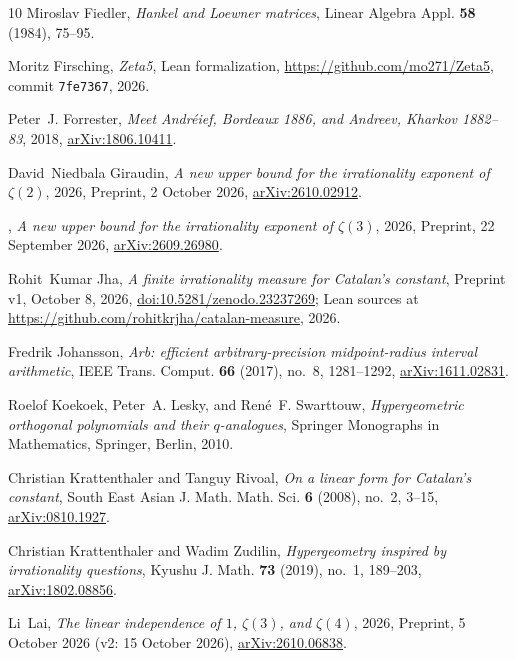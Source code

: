 \documentclass[11pt]{amsart}
\theoremstyle{definition}
\theoremstyle{remark}
\numberwithin{equation}{section}
\begin{document}
\begin{thebibliography}{10}
Miroslav Fiedler, \emph{Hankel and {L}oewner matrices}, Linear Algebra Appl.
  \textbf{58} (1984), 75--95.

Moritz Firsching, \emph{Zeta5}, Lean formalization,
  \url{https://github.com/mo271/Zeta5}, commit \texttt{7fe7367}, 2026.

Peter~J. Forrester, \emph{Meet {A}ndr\'eief, {B}ordeaux 1886, and {A}ndreev,
  {K}harkov 1882--83}, 2018,
  \href{https://arxiv.org/abs/1806.10411}{arXiv:1806.10411}.

David~Niedbala Giraudin, \emph{A new upper bound for the irrationality exponent
  of {$\zeta(2)$}}, 2026, Preprint, 2 October 2026,
  \href{https://arxiv.org/abs/2610.02912}{arXiv:2610.02912}.

\bysame, \emph{A new upper bound for the irrationality exponent of
  {$\zeta(3)$}}, 2026, Preprint, 22 September 2026,
  \href{https://arxiv.org/abs/2609.26980}{arXiv:2609.26980}.

Rohit~Kumar Jha, \emph{A finite irrationality measure for {C}atalan's
  constant}, Preprint v1, October 8, 2026,
  \href{https://doi.org/10.5281/zenodo.23237269}{doi:10.5281/zenodo.23237269};
  Lean sources at \url{https://github.com/rohitkrjha/catalan-measure}, 2026.

Fredrik Johansson, \emph{Arb: efficient arbitrary-precision midpoint-radius
  interval arithmetic}, IEEE Trans. Comput. \textbf{66} (2017), no.~8,
  1281--1292, \href{https://arxiv.org/abs/1611.02831}{arXiv:1611.02831}.

Roelof Koekoek, Peter~A. Lesky, and Ren\'e~F. Swarttouw, \emph{Hypergeometric
  orthogonal polynomials and their {$q$}-analogues}, Springer Monographs in
  Mathematics, Springer, Berlin, 2010.

Christian Krattenthaler and Tanguy Rivoal, \emph{On a linear form for
  {C}atalan's constant}, South East Asian J. Math. Math. Sci. \textbf{6}
  (2008), no.~2, 3--15,
  \href{https://arxiv.org/abs/0810.1927}{arXiv:0810.1927}.

Christian Krattenthaler and Wadim Zudilin, \emph{Hypergeometry inspired by
  irrationality questions}, Kyushu J. Math. \textbf{73} (2019), no.~1,
  189--203, \href{https://arxiv.org/abs/1802.08856}{arXiv:1802.08856}.

Li~Lai, \emph{The linear independence of {$1$}, {$\zeta(3)$}, and
  {$\zeta(4)$}}, 2026, Preprint, 5 October 2026 (v2: 15 October 2026),
  \href{https://arxiv.org/abs/2610.06838}{arXiv:2610.06838}.


\end{thebibliography}
\end{document}

